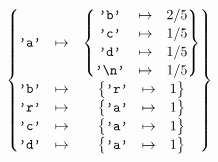 \documentclass[convert={size=400x400,outext=.png}]{standalone}
\begin{document}
\( \def\arraystretch{1.1} 
  \begin{Bmatrix} \verb|'a'| & \mapsto &
  \begin{Bmatrix}
    \verb|'b'| & \mapsto & 2/5 \\
    \verb|'c'| & \mapsto & 1/5 \\
    \verb|'d'| & \mapsto & 1/5 \\
    \verb|'\n'| & \mapsto & 1/5
  \end{Bmatrix} \\
  \verb|'b'| & \mapsto &
  \begin{Bmatrix}
    \verb|'r'| & \mapsto & 1
  \end{Bmatrix} \\
  \verb|'r'| & \mapsto &
  \begin{Bmatrix}
    \verb|'a'| & \mapsto & 1
  \end{Bmatrix} \\
  \verb|'c'| & \mapsto &
  \begin{Bmatrix}
    \verb|'a'| & \mapsto & 1
  \end{Bmatrix} \\
  \verb|'d'| & \mapsto &
  \begin{Bmatrix}
    \verb|'a'| & \mapsto & 1
  \end{Bmatrix} \\
   \end{Bmatrix}
\)
\end{document}
